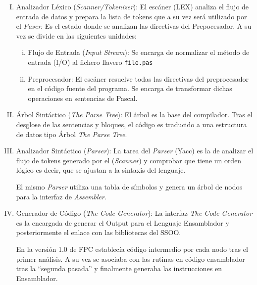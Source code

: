 \begin{enumerate}[I.]

\item Analizador Léxico (\textit{Scanner/Tokenizer}): El escáner (LEX) analiza el flujo de entrada de datos y prepara la lista de tokens que a su vez será utilizado por el \textit{Paser}. Es el estado donde se analizan las directivas del Prepocesador. A su vez se divide en las siguientes unidades:

\begin{enumerate}[i.]

\item Flujo de Entrada (\textit{Input Stream}): Se encarga de normalizar el método de entrada (I/O) al fichero llavero \texttt{file.pas}

\item Preprocesador: El escáner resuelve todas las directivas del preprocesador en el código fuente del programa. Se encarga de transformar dichas operaciones en sentencias de Pascal.

\end{enumerate}



\item Árbol Sintáctico (\textit{The Parse Tree}): El árbol es la base del compilador. Tras el desglose de las sentencias y bloques, el código es traducido a una estructura de datos tipo Árbol \textit{The Parse Tree}.  

\item Analizador Sintáctico (\textit{Parser}): La tarea del \textit{Parser} (Yacc) es la de analizar el flujo de tokens generado por el (\textit{Scanner}) y comprobar que tiene un orden lógico es decir, que se ajustan a la sintaxis del lenguaje.

El mismo \textit{Parser} utiliza una tabla de símbolos y genera un árbol de nodos para la interfaz de \textit{Assembler}.

\item Generador de Código (\textit{The Code Generator}): La interfaz \textit{The Code Generator} es la encargada de generar el Output para el Lenguaje Ensamblador y posteriormente el enlace con las bibliotecas del SSOO.

En la versión 1.0 de FPC establecía código intermedio por cada nodo tras el primer análisis. A su vez se asociaba con las rutinas en código ensamblador tras la ``segunda pasada'' y finalmente generaba las instrucciones en Ensamblador. 

\end{enumerate}